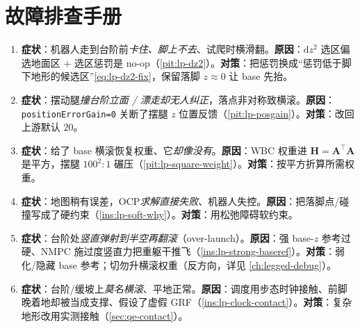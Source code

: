 \section*{故障排查手册}
\begin{enumerate}
  \item \textbf{症状}：机器人走到台阶前\emph{卡住、脚上不去}、试爬时横滑翻。\textbf{原因}：$\mathrm{d}z^2$ 选区偏选地面区 + 选区惩罚是 no-op（\cref{pit:lp-dz2}）。\textbf{对策}：把惩罚换成“惩罚低于脚下地形的候选区”\cref{eq:lp-dz2-fix}，保留落脚 $z\approx 0$ 让 base 先抬。
  \item \textbf{症状}：摆动腿\emph{撞台阶立面 / 漂走却无人纠正}，落点非对称致横滚。\textbf{原因}：\texttt{positionErrorGain=0} 关断了摆腿 $z$ 位置反馈（\cref{pit:lp-posgain}）。\textbf{对策}：改回上游默认 $20$。
  \item \textbf{症状}：给了 base 横滚恢复权重、它\emph{却像没有}。\textbf{原因}：WBC 权重进 $\mathbf{H}=\mathbf{A}^\top\mathbf{A}$ 是平方，摆腿 $100^2{:}1$ 碾压（\cref{pit:lp-square-weight}）。\textbf{对策}：按平方折算所需权重。
  \item \textbf{症状}：地图稍有误差，OCP\emph{求解直接失败}、机器人失控。\textbf{原因}：把落脚点/碰撞写成了硬约束（\cref{ins:lp-soft-why}）。\textbf{对策}：用松弛障碍软约束。
  \item \textbf{症状}：台阶处\emph{竖直弹射到半空再翻滚}（over-launch）。\textbf{原因}：强 base-$z$ 参考过硬、NMPC 施过度竖直力把重躯干推飞（\cref{ins:lp-strong-baseref}）。\textbf{对策}：弱化/隐藏 base 参考；切勿升横滚权重（反方向，详见 \cref{ch:legged-debug}）。
  \item \textbf{症状}：台阶/缓坡上\emph{莫名横滚}、平地正常。\textbf{原因}：调度用步态时钟接触、前脚晚着地却被当成支撑、假设了虚假 GRF（\cref{ins:lp-clock-contact}）。\textbf{对策}：复杂地形改用实测接触（\cref{sec:qe-contact}）。
\end{enumerate}
